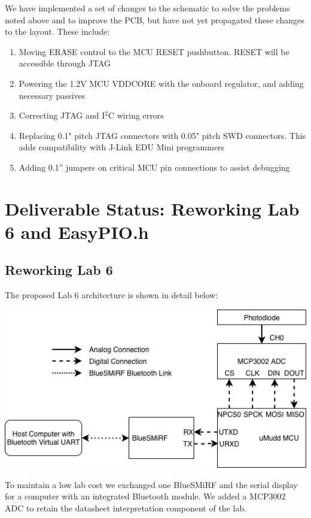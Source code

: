 \documentclass[12pt]{article}
\begin{document}
We have implemented a set of changes to the schematic to solve the problems noted above and to improve the PCB, but have not yet propagated these changes to the layout. These include:

\begin{enumerate}
	\item Moving ERASE control to the MCU RESET pushbutton. RESET will be accessible through JTAG
	\item Powering the 1.2V MCU VDDCORE with the onboard regulator, and adding necessary passives
	\item Correcting JTAG and I$^2$C wiring errors
	\item Replacing 0.1" pitch JTAG connectors with 0.05" pitch SWD connectors. This adds compatibility with J-Link EDU Mini programmers
	\item Adding 0.1'' jumpers on critical MCU pin connections to assist debugging 
\end{enumerate}

\newpage
\section{Deliverable Status: Reworking Lab 6 and EasyPIO.h}

\subsection{Reworking Lab 6}
The proposed Lab 6 architecture is shown in detail below:

\begin{center}
	\includegraphics[width=14cm]{blockdiagram.png}
\end{center}

To maintain a low lab cost we exchanged one BlueSMiRF and the serial display for a computer with an integrated Bluetooth module. We added a MCP3002 ADC to retain the datasheet interpretation component of the lab.
\end{document}

